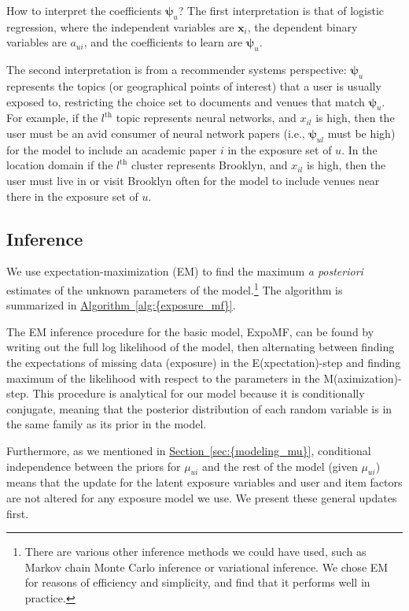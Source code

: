 \documentclass{sig-alternate-arxiv}
\begin{document}
How to interpret the coefficients $\boldsymbol\psi_u$? 
The first interpretation is that of logistic regression, 
where the independent variables are $\mathbf{x}_i$, 
the dependent binary variables are $a_{ui}$, 
and the coefficients to learn are $\boldsymbol\psi_u$. 

The second interpretation is from a recommender systems perspective: 
$\boldsymbol\psi_u$ represents the topics (or geographical points of interest) that a user is usually exposed to, 
restricting the choice set to documents and venues that match $\boldsymbol\psi_u$. 
For example, if the $l^\mathrm{th}$ topic represents neural networks, 
and $x_{il}$ is high, 
then the user must be an avid consumer of neural network papers 
(i.e., $\boldsymbol\psi_{ul}$ must be high) 
for the model to include an academic paper $i$ in the exposure set of $u$.
In the location domain if the $l^\mathrm{th}$ cluster represents Brooklyn, 
and $x_{il}$ is high, 
then the user must live in or visit Brooklyn often 
for the model to include venues near there in the exposure set of $u$. 

\subsection{Inference}
\label{sec:inference}
We use expectation-maximization (EM) \cite{bishop2006pattern} to find the maximum \emph{a posteriori} estimates of the unknown parameters of the model.\footnote{There are various other inference methods we could have used, such as Markov chain Monte Carlo inference or variational inference. We chose EM for reasons of efficiency and simplicity, and find that it performs well in practice.} The algorithm is summarized in {\hyperref[alg:{exposure_mf}]{Algorithm~\ref*{alg:{exposure_mf}}}}.

The EM inference procedure for the basic model, ExpoMF, 
can be found by writing out the full log likelihood of the model, 
then alternating between finding the expectations of missing data (exposure)
in the E(xpectation)-step and finding maximum of the likelihood with respect to the parameters in the M(aximization)-step. 
This procedure is analytical for our model because it is conditionally conjugate, 
meaning that the posterior distribution of each random variable 
is in the same family as its prior in the model. 

Furthermore, as we mentioned in {\hyperref[sec:{modeling_mu}]{Section~\ref*{sec:{modeling_mu}}}}, conditional independence 
between the priors for $\mu_{ui}$ and the rest of the model (given $\mu_{ui}$) 
means that the update for the latent exposure variables and user and item factors are not altered for any exposure model we use. We present these general updates first.
\end{document}
